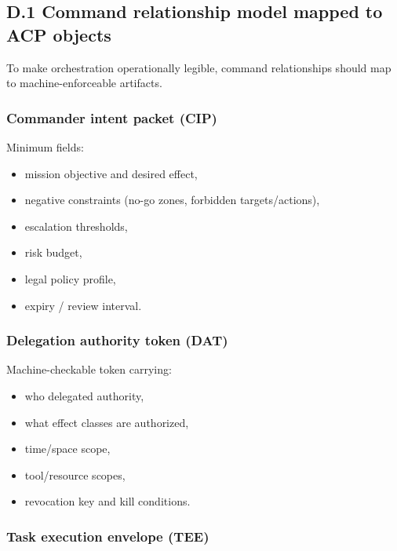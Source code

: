 \documentclass[
]{article}
\providecommand{\tightlist}{%
  \setlength{\itemsep}{0pt}\setlength{\parskip}{0pt}}
\begin{document}
\hypertarget{d.1-command-relationship-model-mapped-to-acp-objects}{%
\subsection{D.1 Command relationship model mapped to ACP
objects}\label{d.1-command-relationship-model-mapped-to-acp-objects}}

To make orchestration operationally legible, command relationships
should map to machine-enforceable artifacts.

\hypertarget{commander-intent-packet-cip}{%
\subsubsection{Commander intent packet
(CIP)}\label{commander-intent-packet-cip}}

Minimum fields:

\begin{itemize}
\tightlist
\item
  mission objective and desired effect,
\item
  negative constraints (no-go zones, forbidden targets/actions),
\item
  escalation thresholds,
\item
  risk budget,
\item
  legal policy profile,
\item
  expiry / review interval.
\end{itemize}

\hypertarget{delegation-authority-token-dat}{%
\subsubsection{Delegation authority token
(DAT)}\label{delegation-authority-token-dat}}

Machine-checkable token carrying:

\begin{itemize}
\tightlist
\item
  who delegated authority,
\item
  what effect classes are authorized,
\item
  time/space scope,
\item
  tool/resource scopes,
\item
  revocation key and kill conditions.
\end{itemize}

\hypertarget{task-execution-envelope-tee}{%
\subsubsection{Task execution envelope
(TEE)}\label{task-execution-envelope-tee}}
\end{document}
